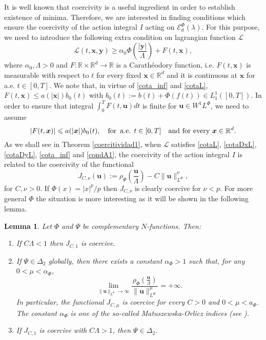\documentclass[twoside]{article}
\newtheorem{lem}[thm]{Lemma}
\theoremstyle{remark}
\newcommand{\orlnor}{\|_{L^{\Phi}}}
\newcommand{\lphi}{L^{\Phi}}
\newcommand{\wphi}{W^{1}\lphi}
\newcommand{\domi}{\mathcal{E}^{\Phi}_d(\lambda)}
\renewcommand{\b}[1]{\boldsymbol{#1}}
\newcommand{\rr}{\mathbb{R}}
\renewcommand{\leq}{\leqslant}
\begin{document}
It is well known that coercivity is a useful ingredient in order to establish existence of minima. Therefore, we are interested in finding conditions which ensure the coercivity of the action integral $I$ acting on $\domi$. For this purpose, we need to introduce the following  extra condition on lagrangian function $\mathcal{L}$  
\begin{equation}\label{cota_inf}
\mathcal{L}(t,\b{x},\b{y})\geq \alpha_0\Phi\left(\frac{|\b{y}|}{\Lambda}\right)+ F(t,\b{x}),
\end{equation}
where $\alpha_0,\Lambda>0$ and  $F:\rr\times\rr^d\to\rr$ is a Carath\'eodory function, i.e. $F(t,\b{x})$ is  measurable with respect to $t$ for every fixed  $\b{x}\in\rr^d$ and it is continuous at $\b{x}$ for a.e. $t\in [0,T]$. We note that, in virtue of \eqref{cota_inf} and \eqref{cotaL}, $F(t,\b{x})\leq a(|\b{x}|)b_0(t)$  with $b_0(t):=b(t)+\Phi(f(t))\in L^1_1([0,T])$. In order to ensure that integral $\int_0^TF(t,\b{u})dt$ is finite for $\b{u}\in\wphi$,  we need to assume 
\begin{equation}\label{condA1} |F(t,\b{x})|\leq a(|\b{x}|)b_0(t),\quad\text{for \,a.e. }t\in [0,T] \quad\text{and for every } \b{x}\in\rr^d.
\end{equation}
As we shall see in Theorem \ref{coercitividad1}, when $\mathcal{L}$ satisfies \eqref{cotaL}, \eqref{cotaDxL}, \eqref{cotaDyL}, \eqref{cota_inf} and \eqref{condA1},  the coercivity of the action integral $I$ is related to the coercivity of the functional
\begin{equation}\label{func_phi}
  J_{C,\nu}(\b{u}):= \rho_{\Phi}\left(\frac{\b{u}}{\Lambda}\right)-C\|\b{u}\orlnor^{\nu},
\end{equation}
for $C,\nu>0$. If $\Phi(x)=|x|^p/p$ then $J_{C,\nu}$ is clearly coercive for $\nu<p$. For more general $\Phi$ the situation is more interesting   as it will be shown in the following lemma.

\begin{lem}\label{lem_coer} Let $\Phi$ and $\Psi$ be complementary $N$-functions. Then:
\begin{enumerate}
  \item If $C\Lambda<1$ then $J_{C,1}$ is coercive. 
  
  \item If $\Psi \in \Delta_2$ globally, then there exists a constant $\alpha_{\Phi}>1$ such that, for any $0<\mu<\alpha_{\Phi}$,
\begin{equation}\label{coer_modular} \lim\limits_{\|\b{u}\orlnor \to \infty} \frac{\rho_{\Phi}\left(\frac{\b{u}}{\Lambda}\right)}{\|\b{u}\orlnor^{\mu}}=+\infty.
\end{equation}
In particular, the functional $J_{C,\mu}$ is coercive for every $C>0$ and  $0<\mu<a_{\Phi}$. The constant $\alpha_{\Phi}$ is one of the so-called \emph{ Matuszewska-Orlicz indices} (see \cite[Ch. 11]{M}).
\item If $J_{C,1}$ is coercive with $C\Lambda>1$, then $\Psi \in \Delta_2$.  
\end{enumerate}
\end{lem}
\end{document}

